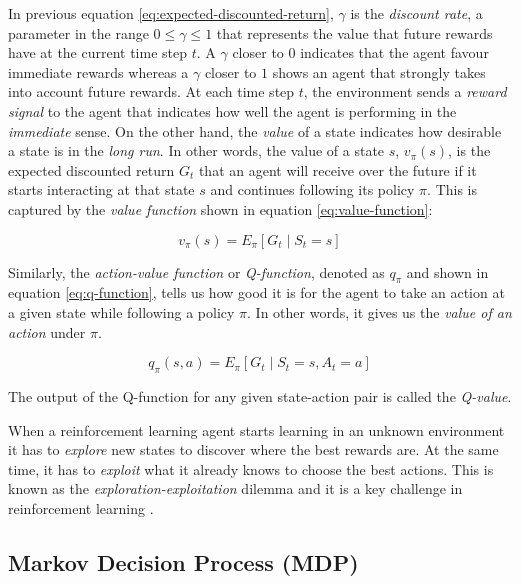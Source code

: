In previous equation \ref{eq:expected-discounted-return}, $\gamma$ is the \textit{discount rate}, a parameter in the range $0 \leq \gamma \leq 1$ that represents the value that future rewards have at the current time step $t$. A $\gamma$ closer to $0$ indicates that the agent favour immediate rewards whereas a $\gamma$ closer to $1$ shows an agent that strongly takes into account future rewards. At each time step $t$, the environment sends a \textit{reward signal} to the agent that indicates how well the agent is performing in the \textit{immediate} sense. On the other hand, the \textit{value} of a state indicates how desirable a state is in the \textit{long run}. In other words, the value of a state $s$, $v_\pi \left(s\right) $, is the expected discounted return $G_t$ that an agent will receive over the future if it starts interacting at that state $s$ and continues following its policy $\pi$. This is captured by the \textit{value function} shown in equation \ref{eq:value-function}:






\begin{equation}
v_\pi \left(s\right) = E_\pi \left[G_{t}\mid S_{t}=s\right]
\label{eq:value-function}
\end{equation}



Similarly, the \textit{action-value function} or \textit{Q-function}, denoted as $q_\pi$ and shown in equation \ref{eq:q-function}, tells us how good it is for the agent to take an action at a given state while following a policy $\pi$. In other words, it gives us the \textit{value of an action} under $\pi$.

\begin{equation}
q_\pi \left( s,a \right) = E_\pi \left[ G_{t}\mid S_{t}=s,A_{t}=a \right] 
\label{eq:q-function}
\end{equation}


The output of the Q-function for any given state-action pair is called the \textit{Q-value}. 

When a reinforcement learning agent starts learning in an unknown environment it has to \textit{explore} new states to discover where the best rewards are. At the same time, it has to \textit{exploit} what it already knows to choose the best actions. This is known as the \textit{exploration-exploitation }dilemma and it is a key challenge in reinforcement learning \cite{Sutton:1998}.


\subsection{Markov Decision Process (MDP)}

